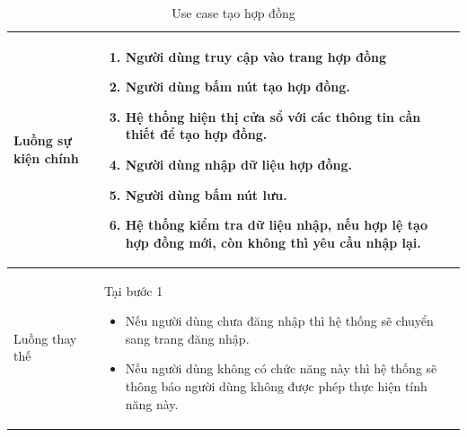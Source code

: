 \documentclass[12pt,a4paper]{article}
\begin{document}
\begin{table}[H]
\begin{tabular}{|p{3.5cm}|p{11.5cm}|c|}
            Luồng sự kiện chính & \vspace{-.8cm}\begin{enumerate}
                                                    \item Người dùng truy cập vào trang hợp đồng
                                                    \item  Người dùng bấm nút tạo hợp đồng.
                                                    \item  Hệ thống hiện thị cửa sổ với các thông tin cần thiết để tạo hợp đồng.
                                                    \item  Người dùng nhập dữ liệu hợp đồng.
                                                    \item Người dùng bấm nút lưu.
                                                    \item Hệ thống kiểm tra dữ liệu nhập, nếu hợp lệ tạo hợp đồng mới, còn không thì yêu cầu nhập lại.
            \end{enumerate}
            \\
            \hline
            Luồng thay thế & Tại bước 1\newline
            \vspace{-.8cm}\begin{itemize}
                              \item Nếu người dùng chưa đăng nhập thì hệ thống sẽ chuyển sang trang đăng nhập.
                              \item  Nếu người dùng không có chức năng này thì hệ thống sẽ thông báo người dùng không được phép thực hiện tính năng này.
            \end{itemize}
            \\
            \hline
        \end{tabular}
        \caption{Use case tạo hợp đồng}
    \end{table}


\end{document}
